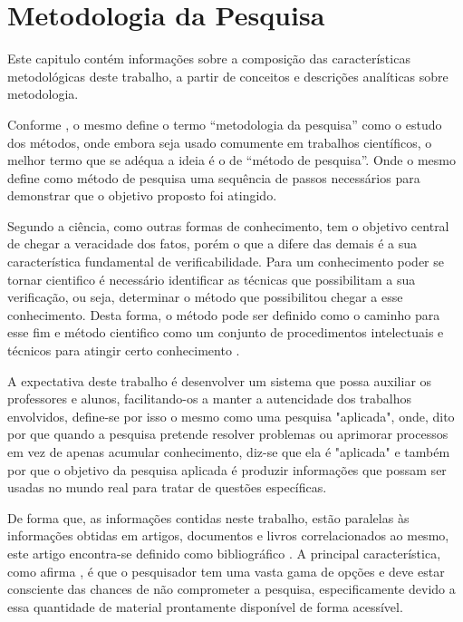 \chapter{Metodologia da Pesquisa}\label{ch:metodologia-da-pesquisa}

Este capitulo contém informações sobre a composição das
características metodológicas deste trabalho, a partir de conceitos e
descrições analíticas sobre metodologia.

Conforme \textcite{wazlawick2009}, o mesmo define o termo
“metodologia da pesquisa” como o estudo dos métodos, onde embora
seja usado comumente em trabalhos científicos, o melhor termo que
se adéqua a ideia é o de “método de pesquisa”.
Onde o mesmo define como método de pesquisa uma sequência de passos
necessários para demonstrar que o objetivo proposto foi atingido.

Segundo \textcite{gil2017} a ciência, como outras formas de
conhecimento, tem o objetivo central de chegar a veracidade dos
fatos, porém o que a difere das demais é a sua característica
fundamental de verificabilidade.
Para um conhecimento poder se tornar cientifico é necessário
identificar as técnicas que possibilitam a sua verificação, ou seja,
determinar o método que possibilitou chegar a esse conhecimento.
Desta forma, o método pode ser definido como o caminho para esse fim
e método cientifico como um conjunto de procedimentos intelectuais
e técnicos para atingir certo conhecimento \cite{gil2017}.

A expectativa deste trabalho é desenvolver um sistema
que possa auxiliar os professores e alunos, facilitando-os a manter
a autencidade dos trabalhos envolvidos, define-se por isso o mesmo
como uma pesquisa "aplicada", onde, dito por \textcite{gil2017} que
quando a pesquisa pretende resolver problemas ou aprimorar processos
em vez de apenas acumular conhecimento, diz-se que ela é "aplicada"
e também por \textcite{prodanov2013} que o objetivo da pesquisa
aplicada é produzir informações que possam ser usadas no mundo real
para tratar de questões específicas.

De forma que, as informações contidas neste trabalho, estão paralelas
às informações obtidas em artigos, documentos e livros correlacionados
ao mesmo, este artigo encontra-se definido como bibliográfico \cite{prodanov2013}.
A principal característica, como afirma \textcite{gil2017}, é que o
pesquisador tem uma vasta gama de opções e deve estar consciente das
chances de não comprometer a pesquisa, especificamente devido a essa
quantidade de material prontamente disponível de forma acessível.

